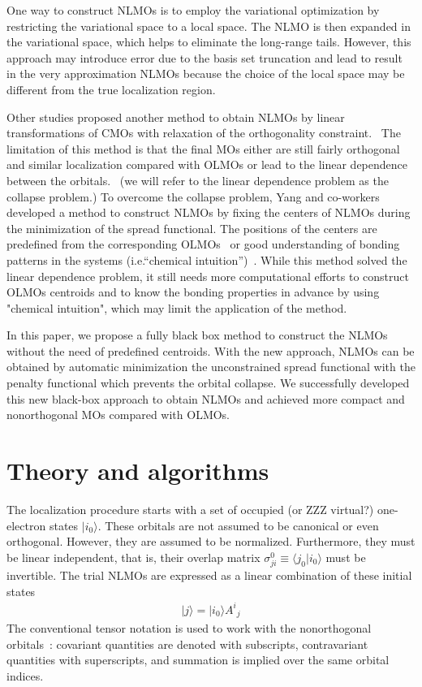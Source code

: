 \documentclass[aps,prl,reprint,amsmath,amssymb]{revtex4-1}
\newcommand{\ket}[1]{\ensuremath{\vert #1 \rangle}}
\newcommand{\braket}[2]{\ensuremath{\langle #1 \vert #2 \rangle}} %
\begin{document}
One way to construct NLMOs is to employ the variational optimization by restricting the variational space to a local space.
The NLMO is then expanded in the variational space, which helps to eliminate the long-range tails.
However, this approach may introduce error due to the basis set truncation and lead to result in the very approximation NLMOs because the choice of the local space may be different from the true localization region.

Other studies proposed another method to obtain NLMOs by linear transformations of CMOs with relaxation of the orthogonality constraint.~\cite{feng2004An_efficient, cui2010efficient} 
The limitation of this method is that the final MOs either are still fairly orthogonal and similar localization compared with OLMOs or lead to the linear dependence between the orbitals.~\cite{feng2004An_efficient} (we will refer to the linear dependence problem as the collapse problem.)
To overcome the collapse problem, Yang and co-workers~\cite{feng2004An_efficient, cui2010efficient}  developed a method to construct NLMOs by fixing the centers of NLMOs during the minimization of the spread functional. 
The positions of the centers are predefined from the corresponding OLMOs~\cite{feng2004An_efficient} or good understanding of bonding patterns in the systems (i.e.``chemical intuition'')~\cite{cui2010efficient}.
While this method solved the linear dependence problem, it still needs more computational efforts to construct OLMOs centroids and to know the bonding properties in advance by using "chemical intuition", which may limit the application of the method.

In this paper, we propose a fully black box method to construct the NLMOs without the need of predefined centroids.
With the new approach, NLMOs can be obtained by automatic minimization the unconstrained spread functional with the  penalty functional which prevents the orbital collapse.
We successfully developed this new black-box approach to obtain NLMOs and achieved more compact and nonorthogonal MOs compared with OLMOs.

\section{Theory and algorithms}

The localization procedure starts with a set of occupied (or ZZZ virtual?) one-electron states $\ket{i_0}$. 
These orbitals are not assumed to be canonical or even orthogonal. 
However, they are assumed to be normalized. 
Furthermore, they must be linear independent, that is, their overlap matrix $\sigma_{ji}^0 \equiv \braket{j_0}{i_0}$ must be invertible. 
The trial NLMOs are expressed as a linear combination of these initial states
%
\begin{equation}
\begin{split}
\ket{j} = \ket{i_0} {A^i}_j  
\end{split}
\end{equation}
%
The conventional tensor notation is used to work with the nonorthogonal orbitals~\cite{head1998tensor}: covariant quantities are denoted with subscripts, contravariant quantities with superscripts, and summation is implied over the same orbital indices.
\end{document}
